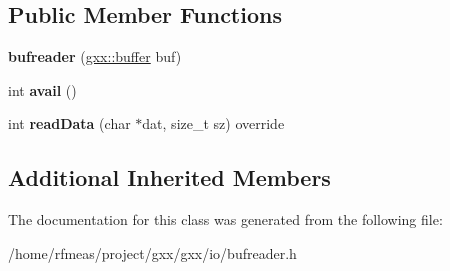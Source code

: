 \subsection*{Public Member Functions}
\begin{DoxyCompactItemize}
\item 
{\bfseries bufreader} (\hyperlink{classgxx_1_1buffer}{gxx\+::buffer} buf)\hypertarget{classgxx_1_1io_1_1bufreader_a871b9310e3a430f104db147871fb93fa}{}\label{classgxx_1_1io_1_1bufreader_a871b9310e3a430f104db147871fb93fa}

\item 
int {\bfseries avail} ()\hypertarget{classgxx_1_1io_1_1bufreader_a49b787c9b5416fe85e7307015d8839e5}{}\label{classgxx_1_1io_1_1bufreader_a49b787c9b5416fe85e7307015d8839e5}

\item 
int {\bfseries read\+Data} (char $\ast$dat, size\+\_\+t sz) override\hypertarget{classgxx_1_1io_1_1bufreader_aa329e29d43c25d0565c56f727ca97ea0}{}\label{classgxx_1_1io_1_1bufreader_aa329e29d43c25d0565c56f727ca97ea0}

\end{DoxyCompactItemize}
\subsection*{Additional Inherited Members}


The documentation for this class was generated from the following file\+:\begin{DoxyCompactItemize}
\item 
/home/rfmeas/project/gxx/gxx/io/bufreader.\+h\end{DoxyCompactItemize}
